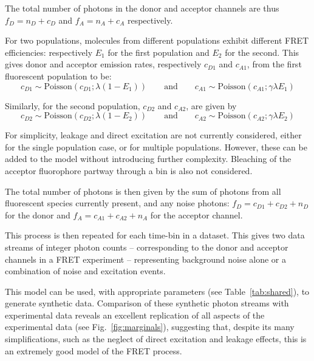 The total number of photons in the donor and acceptor channels are thus $f_D = n_D + c_D$ and $f_A = n_A + c_A$ respectively.   

For two populations, molecules from different populations exhibit different FRET efficiencies: respectively $E_1$ for the first population and $E_2$ for the second. This gives donor and acceptor emission rates, respectively $c_{D1}$ and $c_{A1}$, from the first fluorescent population to be:
\begin{equation}
 c_{D1} \sim \text{Poisson}(c_{D1}; \lambda(1-E_1)) \qquad \text{and} \qquad c_{A1} \sim \text{Poisson}(c_{A1}; \gamma \lambda E_1) 
\end{equation}

Similarly, for the second population, $c_{D2}$ and $c_{A2}$, are given by
\begin{equation}
 c_{D2} \sim \text{Poisson}(c_{D2}; \lambda(1-E_2)) \qquad \text{and} \qquad c_{A2} \sim \text{Poisson}(c_{A2}; \gamma \lambda E_2) 
\end{equation}

For simplicity, leakage and direct excitation are not currently considered, either for the single population case, or for multiple populations. However, these can be added to the model without introducing further complexity. Bleaching of the acceptor fluorophore partway through a bin is also not considered. 

The total number of photons is then given by the sum of photons from all fluorescent species currently present, and any noise photons: $f_D = c_{D1}+c_{D2}+n_D$ for the donor and $f_A = c_{A1}+c_{A2} +n_A$ for the acceptor channel.     

This process is then repeated for each time-bin in a dataset. This gives two data streams of integer photon counts -- corresponding to the donor and acceptor channels in a FRET experiment -- representing background noise alone or a combination of noise and excitation events.

This model can be used, with appropriate parameters (see Table~\ref{tab:shared}), to generate synthetic data. Comparison of these synthetic photon streams with experimental data reveals an excellent replication of all aspects of the experimental data (see Fig.~\ref{fig:marginals}), suggesting that, despite its many simplifications, such as the neglect of direct excitation and leakage effects, this is an extremely good model of the FRET process. 

